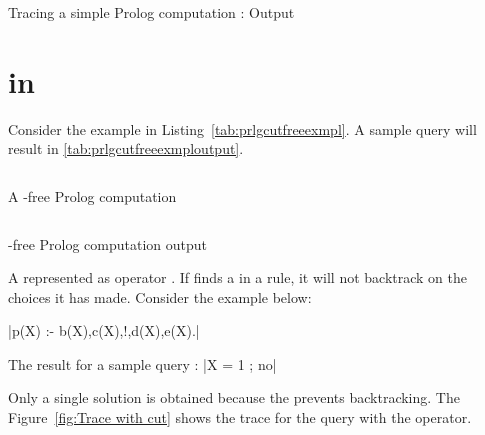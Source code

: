 \documentclass[thesis-solanki.tex]{subfiles}
\begin{document}
\begin{code-list}[H]
  \begin{singlespace}
    \inputminted[linenos, firstline=7]{prolog}{prologprogramtrace.pl}
  \end{singlespace}
  \caption{Tracing a simple Prolog computation \cite{Sterling:1994:APA:175753} : Output}
\label{tab:prlgprgrmtrceop}
\end{code-list}

\section{ in }
Consider the example in Listing~\ref{tab:prlgcutfreeexmpl}.
A sample query  will result in \ref{tab:prlgcutfreeexmploutput}. 

\begin{code-list}[H]
  \begin{singlespace}
    \inputminted[linenos]{prolog}{prlgcutfreeexmpl.pl}
  \end{singlespace}
  \caption{A -free Prolog computation \cite{website:cutprologunionedu}}
\label{tab:prlgcutfreeexmpl}
\end{code-list}

\begin{code-list}[H]
  \begin{singlespace}
    \inputminted[linenos]{prolog}{prlgcutfreeexmploutput.pl}
  \end{singlespace}
  \caption{-free Prolog computation output\cite{website:cutprologunionedu}}
\label{tab:prlgcutfreeexmploutput}
\end{code-list}

A  represented as \prologConstruct{!}
operator \cite{website:prologcut}.
If  finds a  in a rule, it will not backtrack on the choices it has made.
Consider the example below:

|p(X) :- b(X),c(X),!,d(X),e(X).|

\noindent The result for a sample query :
|X = 1 ; no|

Only a single solution is obtained because the  prevents backtracking. The Figure~\ref{fig:Trace with cut} shows the 
trace for the query with the  operator.
\end{document}
